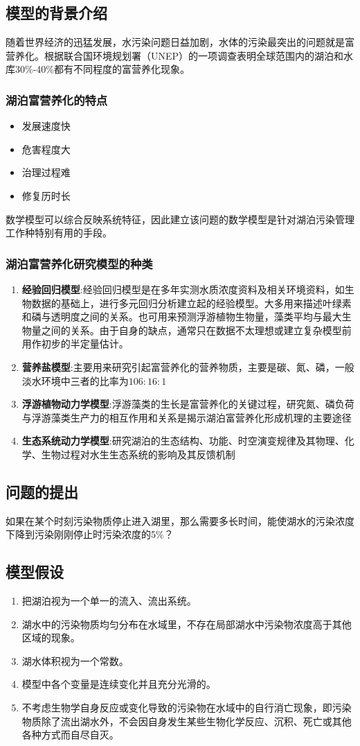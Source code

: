 \documentclass[openany]{progbookcn}
\begin{document}
\subsection{模型的背景介绍}
\indent 随着世界经济的迅猛发展，水污染问题日益加剧，水体的污染最突出的问题就是富营养化。根据联合国环境规划署（UNEP）的一项调查表明全球范围内的湖泊和水库30\%-40\%都有不同程度的富营养化现象。
\subsubsection{湖泊富营养化的特点}
\begin{itemize}
\item 发展速度快
\item 危害程度大
\item 治理过程难
\item 修复历时长
\end{itemize}
\indent\indent 数学模型可以综合反映系统特征，因此建立该问题的数学模型是针对湖泊污染管理工作种特别有用的手段。
\subsubsection{湖泊富营养化研究模型的种类}
\begin{enumerate}
\item {\bf 经验回归模型}:经验回归模型是在多年实测水质浓度资料及相关环境资料，如生物数据的基础上，进行多元回归分析建立起的经验模型。大多用来描述叶绿素和磷与透明度之间的关系。也可用来预测浮游植物生物量，藻类平均与最大生物量之间的关系。由于自身的缺点，通常只在数据不太理想或建立复杂模型前用作初步的半定量估计。
\item {\bf 营养盐模型}:主要用来研究引起富营养化的营养物质，主要是碳、氮、磷，一般淡水环境中三者的比率为$106:16:1$
\item {\bf 浮游植物动力学模型}:浮游藻类的生长是富营养化的关键过程，研究氮、磷负荷与浮游藻类生产力的相互作用和关系是揭示湖泊富营养化形成机理的主要途径
\item {\bf 生态系统动力学模型}:研究湖泊的生态结构、功能、时空演变规律及其物理、化学、生物过程对水生生态系统的影响及其反馈机制
\end{enumerate}
\subsection{问题的提出}
\indent 如果在某个时刻污染物质停止进入湖里，那么需要多长时间，能使湖水的污染浓度下降到污染刚刚停止时污染浓度的5\%？
\subsection{模型假设}
\begin{enumerate}
\item 把湖泊视为一个单一的流入、流出系统。
\item 湖水中的污染物质均匀分布在水域里，不存在局部湖水中污染物浓度高于其他区域的现象。
\item 湖水体积视为一个常数。
\item 模型中各个变量是连续变化并且充分光滑的。
\item 不考虑生物学自身反应或变化导致的污染物在水域中的自行消亡现象，即污染物质除了流出湖水外，不会因自身发生某些生物化学反应、沉积、死亡或其他各种方式而自尽自灭。
\end{enumerate}
\end{document}
